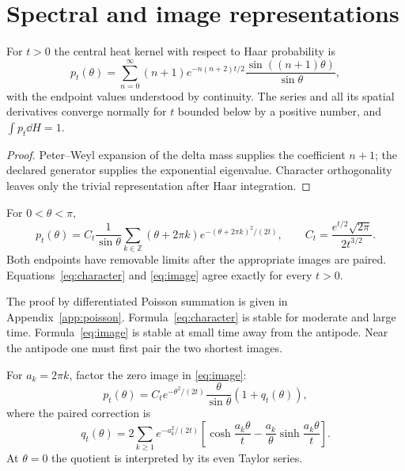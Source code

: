 \section{Spectral and image representations}\label{sec:formulas}

\begin{proposition}\label{prop:character}
For $t>0$ the central heat kernel with respect to Haar probability is
\begin{equation}\label{eq:character}
 p_t(\theta)=\sum_{n=0}^{\infty}(n+1)e^{-n(n+2)t/2}
 \frac{\sin((n+1)\theta)}{\sin\theta},
\end{equation}
with the endpoint values understood by continuity.  The series and all its
spatial derivatives converge normally for $t$ bounded below by a positive
number, and $\int p_t\dd H=1$.
\end{proposition}

\begin{proof}
Peter--Weyl expansion of the delta mass supplies the coefficient $n+1$;
the declared generator supplies the exponential eigenvalue.  Character
orthogonality leaves only the trivial representation after Haar integration.
\end{proof}

\begin{proposition}\label{prop:image}
For $0<\theta<\pi$,
\begin{equation}\label{eq:image}
 p_t(\theta)=C_t\frac{1}{\sin\theta}
 \sum_{k\in\mathbb Z}(\theta+2\pi k)
 e^{-(\theta+2\pi k)^2/(2t)},
 \qquad C_t=\frac{e^{t/2}\sqrt{2\pi}}{2t^{3/2}}.
\end{equation}
Both endpoints have removable limits after the appropriate images are paired.
Equations~\eqref{eq:character} and \eqref{eq:image} agree exactly for every
$t>0$.
\end{proposition}

The proof by differentiated Poisson summation is given in
Appendix~\ref{app:poisson}.  Formula~\eqref{eq:character} is stable for
moderate and large time.  Formula~\eqref{eq:image} is stable at small time
away from the antipode.  Near the antipode one must first pair the two shortest
images.

For $a_k=2\pi k$, factor the zero image in \eqref{eq:image}:
\begin{equation}\label{eq:factorization}
 p_t(\theta)=C_t e^{-\theta^2/(2t)}\frac{\theta}{\sin\theta}
 (1+q_t(\theta)),
\end{equation}
where the paired correction is
\begin{equation}\label{eq:q}
q_t(\theta)=2\sum_{k\ge1}e^{-a_k^2/(2t)}
\left[\cosh\frac{a_k\theta}{t}
-\frac{a_k}{\theta}\sinh\frac{a_k\theta}{t}\right].
\end{equation}
At $\theta=0$ the quotient is interpreted by its even Taylor series.

